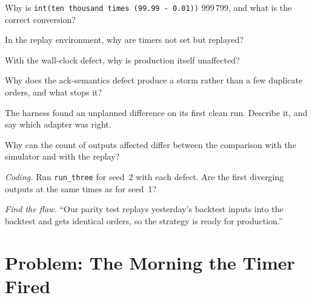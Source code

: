 \begin{exercise}[$\star$]\label{exo:pl:simulation-production-parity:1}
Why is \texttt{int(ten thousand times (99.99 - 0.01))} 999\,799, and what is the correct conversion?
\end{exercise}

\begin{exercise}[$\star$]\label{exo:pl:simulation-production-parity:2}
In the replay environment, why are timers not set but replayed?
\end{exercise}

\begin{exercise}[$\star$]\label{exo:pl:simulation-production-parity:3}
With the wall-clock defect, why is production itself unaffected?
\end{exercise}

\begin{exercise}[$\star\star$]\label{exo:pl:simulation-production-parity:4}
Why does the ack-semantics defect produce a storm rather than a few duplicate orders, and what stops it?
\end{exercise}

\begin{exercise}[$\star\star$]\label{exo:pl:simulation-production-parity:5}
The harness found an unplanned difference on its first clean run. Describe it, and say which adapter was right.
\end{exercise}

\begin{exercise}[$\star\star$]\label{exo:pl:simulation-production-parity:6}
Why can the count of outputs affected differ between the comparison with the simulator and with the replay?
\end{exercise}

\begin{exercise}[$\star\star\star$]\label{exo:pl:simulation-production-parity:7}
\emph{Coding.} Run \texttt{run\_three} for seed~2 with each defect. Are the first diverging outputs at the same times as for seed~1?
\end{exercise}

\begin{exercise}[$\star\star\star$]\label{exo:pl:simulation-production-parity:8}
\emph{Find the flaw.} ``Our parity test replays yesterday's backtest inputs into the backtest and gets identical orders, so the strategy
is ready for production.''
\end{exercise}

\section{Problem: The Morning the Timer Fired}

